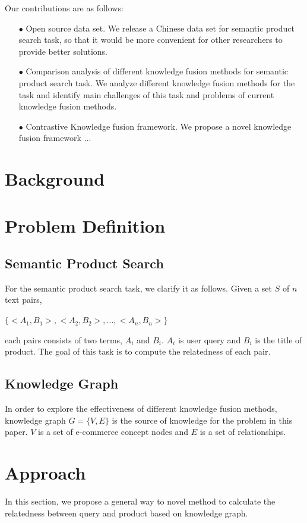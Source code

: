 \documentclass{article}
\begin{document}
Our contributions are as follows:
\begin{itemize}
\item[$\bullet$] Open source data set. We release a Chinese data set for semantic product search task, so that it would be more convenient for other researchers to provide better solutions. 
\item[$\bullet$] Comparison analysis of different knowledge fusion methods for semantic product search task. We analyze different knowledge fusion methods for the task and identify main challenges of this task and problems of current knowledge fusion methods.
\item[$\bullet$] Contrastive Knowledge fusion framework. We propose a novel knowledge fusion framework ... 
\end{itemize}


\section{Background}

\section{Problem Definition}

\subsection{Semantic Product Search}

For the semantic product search task, we clarify it as follows. Given a set $ S $ of $ n $ text pairs,

$ \{<A_{1},B_{1}>,<A_{2},B_{2}>, ... ,<A_{n},B_{n}>\} $

each pairs consists of two terms, $A_{i}$ and $B_{i}$.  $A_{i}$ is user query and $B_{i}$ is the title of product. The goal of this task is to compute the relatedness of each pair. 
\subsection{Knowledge Graph}

In order to explore the effectiveness of different knowledge fusion methods, knowledge graph $G=\{V,E\}$ is the source of knowledge for the problem in this paper. $V$ is a set of e-commerce concept nodes and $E$ is a set of relationships.


\section{Approach}
In this section, we propose a general way to  novel method to calculate the relatedness between query and product based on knowledge graph.
\end{document}
